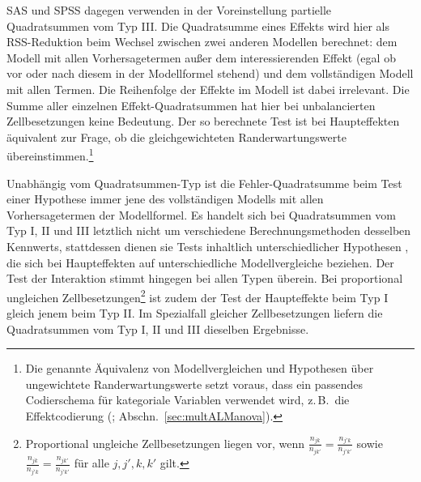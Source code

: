 SAS und SPSS dagegen verwenden in der Voreinstellung partielle Quadratsummen vom Typ III\@. Die Quadratsumme eines Effekts wird hier als RSS-Reduktion beim Wechsel zwischen zwei anderen Modellen berechnet: dem Modell mit allen Vorhersagetermen außer dem interessierenden Effekt (egal ob vor oder nach diesem in der Modellformel stehend) und dem vollständigen Modell mit allen Termen. Die Reihenfolge der Effekte im Modell ist dabei irrelevant. Die Summe aller einzelnen Effekt-Quadratsummen hat hier bei unbalancierten Zellbesetzungen keine Bedeutung. Der so berechnete Test ist bei Haupteffekten äquivalent zur Frage, ob die gleichgewichteten Randerwartungswerte übereinstimmen.\footnote{\label{ftn:ssTypesCodes}Die genannte Äquivalenz von Modellvergleichen und Hypothesen über ungewichtete Randerwartungswerte setzt voraus, dass ein passendes Codierschema für kategoriale Variablen verwendet wird, z.\,B.\ die Effektcodierung (; Abschn.\ \ref{sec:multALManova}).}

Unabhängig vom Quadratsummen-Typ ist die Fehler-Quadratsumme beim Test einer Hypothese immer jene des vollständigen Modells mit allen Vorhersagetermen der Modellformel. Es handelt sich bei Quadratsummen vom Typ I, II und III letztlich nicht um verschiedene Berechnungsmethoden desselben Kennwerts, stattdessen dienen sie Tests inhaltlich unterschiedlicher Hypothesen \cite{Blair1978}, die sich bei Haupteffekten auf unterschiedliche Modellvergleiche beziehen. Der Test der Interaktion stimmt hingegen bei allen Typen überein. Bei proportional ungleichen Zellbesetzungen\footnote{Proportional ungleiche Zellbesetzungen liegen vor, wenn $\frac{n_{jk}}{n_{jk'}} = \frac{n_{j'k}}{n_{j'k'}}$ sowie $\frac{n_{jk}}{n_{j'k}} = \frac{n_{jk'}}{n_{j'k'}}$ für alle $j, j', k, k'$ gilt.} ist zudem der Test der Haupteffekte beim Typ I gleich jenem beim Typ II. Im Spezialfall gleicher Zellbesetzungen liefern die Quadratsummen vom Typ I, II und III dieselben Ergebnisse.

